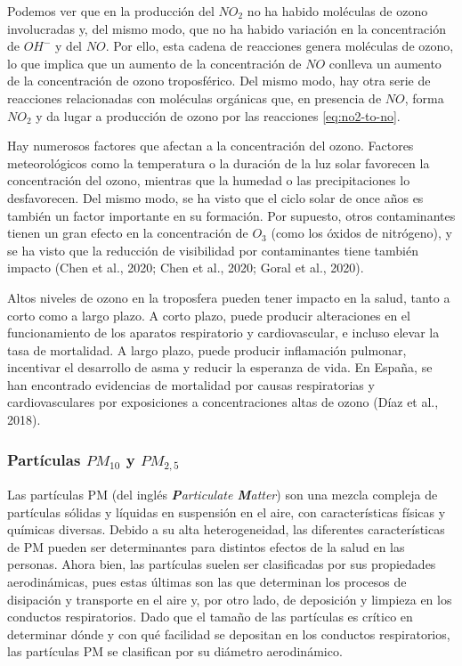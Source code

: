 \documentclass[12pt]{article}
\begin{document}
Podemos ver que en la producción del $NO_{2}$ no ha habido moléculas de ozono involucradas y, del mismo modo, que no ha habido variación en la concentración de $OH^{-}$ y del $NO$. Por ello, esta cadena de reacciones genera moléculas de ozono, lo que implica que un aumento de la concentración de $NO$ conlleva un aumento de la concentración de ozono troposférico. Del mismo modo, hay otra serie de reacciones relacionadas con moléculas orgánicas que, en presencia de $NO$, forma $NO_{2}$ y da lugar a producción de ozono por las reacciones \ref{eq:no2-to-no}.

Hay numerosos factores que afectan a la concentración del ozono. Factores meteorológicos como la temperatura o la duración de la luz solar favorecen la concentración del ozono, mientras que la humedad o las precipitaciones lo desfavorecen. Del mismo modo, se ha visto que el ciclo solar de once años es también un factor importante en su formación. Por supuesto, otros contaminantes tienen un gran efecto en la concentración de $O_{3}$ (como los óxidos de nitrógeno), y se ha visto que la reducción de visibilidad por contaminantes tiene también impacto (Chen et al., 2020; Chen et al., 2020; Goral et al., 2020).

Altos niveles de ozono en la troposfera pueden tener impacto en la salud, tanto a corto como a largo plazo. A corto plazo, puede producir alteraciones en el funcionamiento de los aparatos respiratorio y cardiovascular, e incluso elevar la tasa de mortalidad. A largo plazo, puede producir inflamación pulmonar, incentivar el desarrollo de asma y reducir la esperanza de vida. En España, se han encontrado evidencias de mortalidad por causas respiratorias y cardiovasculares por exposiciones a concentraciones altas de ozono (Díaz et al., 2018).

\subsubsection*{Partículas \textbf{\texorpdfstring{$PM_{10}$}{PM10}} y \textbf{\texorpdfstring{$PM_{2,5}$}{PM2,5}}}
%

Las partículas PM (del inglés \textit{\textbf{P}articulate \textbf{M}atter}) son una mezcla compleja de partículas sólidas y líquidas en suspensión en el aire, con características físicas y químicas diversas. Debido a su alta heterogeneidad, las diferentes características de PM pueden ser determinantes para distintos efectos de la salud en las personas. Ahora bien, las partículas suelen ser clasificadas por sus propiedades aerodinámicas, pues estas últimas son las que determinan los procesos de disipación y transporte en el aire y, por otro lado, de deposición y limpieza en los conductos respiratorios. Dado que el tamaño de las partículas es crítico en determinar dónde y con qué facilidad se depositan en los conductos respiratorios, las partículas PM se clasifican por su diámetro aerodinámico.
\end{document}
